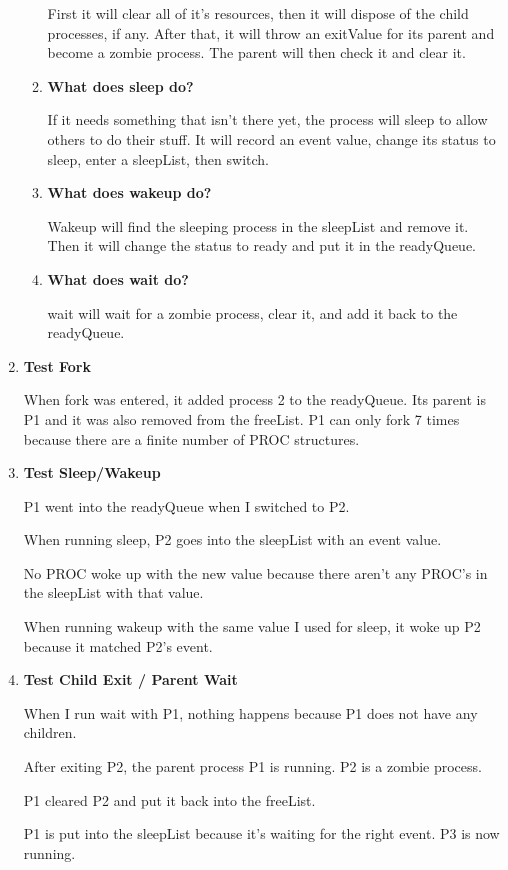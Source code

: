 \documentclass{article}
\begin{document}
\begin{enumerate}
\begin{enumerate}
        First it will clear all of it's resources, then it will dispose of the child processes, if any. After that, it will throw an exitValue for its parent and become a zombie process. The parent will then check it and clear it.
        \item \textbf{What does sleep do?}

        If it needs something that isn't there yet, the process will sleep to allow others to do their stuff. It will record an event value, change its status to sleep, enter a sleepList, then switch.
        \item \textbf{What does wakeup do?}

        Wakeup will find the sleeping process in the sleepList and remove it. Then it will change the status to ready and put it in the readyQueue.
        \item \textbf{What does wait do?}

        wait will wait for a zombie process, clear it, and add it back to the readyQueue.
    \end{enumerate}
    \item \textbf{Test Fork}

    When fork was entered, it added process 2 to the readyQueue. Its parent is P1 and it was also removed from the freeList.
    P1 can only fork 7 times because there are a finite number of PROC structures.
    \item \textbf{Test Sleep/Wakeup}

    P1 went into the readyQueue when I switched to P2.

    When running sleep, P2 goes into the sleepList with an event value.

    No PROC woke up with the new value because there aren't any PROC's in the sleepList with that value.

    When running wakeup with the same value I used for sleep, it woke up P2 because it matched P2's event.
    \item \textbf{Test Child Exit / Parent Wait}

    When I run wait with P1, nothing happens because P1 does not have any children.

    After exiting P2, the parent process P1 is running. P2 is a zombie process.

    P1 cleared P2 and put it back into the freeList.

    P1 is put into the sleepList because it's waiting for the right event. P3 is now running.


\end{enumerate}
\end{document}
